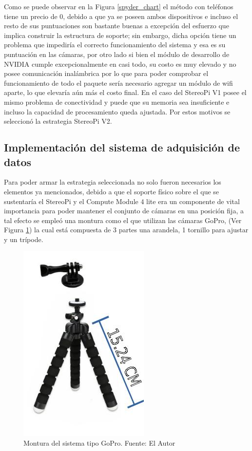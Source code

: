 Como se puede observar en la Figura \ref{spyder_chart} el método con teléfonos tiene un precio de 0, debido a que ya se poseen ambos dispositivos e incluso el resto de sus puntuaciones son bastante buenas a excepción del esfuerzo que implica construir la estructura de soporte; sin embargo, dicha opción tiene un problema que impediría el correcto funcionamiento del sistema y esa es su puntuación en las cámaras, por otro lado si bien el módulo de desarrollo de NVIDIA cumple excepcionalmente en casi todo, su costo es muy elevado y no posee comunicación inalámbrica por lo que para poder comprobar el funcionamiento de todo el paquete sería necesario agregar un módulo de wifi aparte, lo que elevaría aún más el costo final. En el caso del StereoPi V1 posee el mismo problema de conectividad y puede que su memoria sea insuficiente e incluso la capacidad de procesamiento queda ajustada. Por estos motivos se seleccionó la estrategia StereoPi V2.  
\subsection{Implementación del sistema de adquisición de datos}
Para poder armar la estrategia seleccionada no solo fueron necesarios los elementos ya mencionados, debido a que el soporte físico sobre el que se sustentaría el StereoPi y el Compute Module 4 lite era un componente de vital importancia para poder mantener el conjunto de cámaras en una posición fija, a tal efecto se empleó una montura como el que utilizan las cámaras GoPro, (Ver Figura \ref{gopro_support}) la cual está compuesta de 3 partes una arandela, 1 tornillo para ajustar y un trípode.
\begin{figure}[H]
    \centering
    \includegraphics[scale=0.5]{Recursos/go_pro_support.jpg}
    \caption[Montura del sistema tipo GoPro.]{Montura del sistema tipo GoPro. {\footnotesize Fuente: El Autor}}
    \label{gopro_support}
\end{figure}
